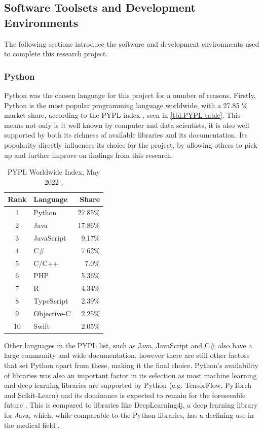 \subsection{Software Toolsets and Development Environments}
The following sections introduce the software and development environments used to complete this research project.

\subsubsection{Python}
Python was the chosen language for this project for a number of reasons. Firstly, Python is the most popular programming language worldwide, with a 27.85 \% market share, according to the PYPL index \citep{PYPLPopu3:online}, seen in \autoref{tbl:PYPL-table}. This means not only is it well known by computer and data scientists, it is also well supported by both its richness of available libraries and its documentation. Its popularity directly influences its choice for the project, by allowing others to pick up and further improve on findings from this research. 

\begin{table}[H]
    \caption{PYPL Worldwide Index, May 2022 \citep{PYPLPopu3:online}.}
    \centering
    \begin{tabular}{c|l|r}
        Rank & Language & Share \\
        \hline\hline
        1 & Python & 27.85\% \\
        2 & Java & 17.86\% \\
        3 & JavaScript & 9.17\% \\
        4 & C\# & 7.62\% \\
        5 & C/C++ & 7.0\% \\
        6 & PHP & 5.36\% \\
        7 & R & 4.34\% \\
        8 & TypeScript & 2.39\% \\
        9 & Objective-C & 2.25\% \\
        10 & Swift & 2.05\% \\
    \end{tabular}
    \label{tbl:PYPL-table}
\end{table}

Other languages in the PYPL list, such as Java, JavaScript and C\# also have a large community and wide documentation, however there are still other factors that set Python apart from these, making it the final choice. Python’s availability of libraries was also an important factor in its selection as most machine learning and deep learning libraries are supported by Python (e.g. TensorFlow, PyTorch and Scikit-Learn) and its dominance is expected to remain for the foreseeable future \citep{raschka2020machine}. This is compared to libraries like DeepLearning4j, a deep learning library for Java, which, while comparable to the Python libraries, has a declining use in the medical field \citep{erickson2017toolkits}. 

